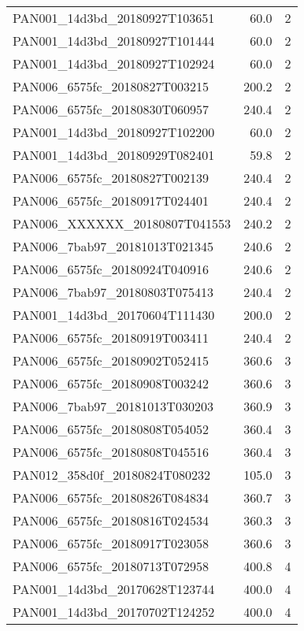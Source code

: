 \begin{tabular}{lrr}
PAN001\_14d3bd\_20180927T103651 &       60.0 &        2 \\
PAN001\_14d3bd\_20180927T101444 &       60.0 &        2 \\
PAN001\_14d3bd\_20180927T102924 &       60.0 &        2 \\
PAN006\_6575fc\_20180827T003215 &      200.2 &        2 \\
PAN006\_6575fc\_20180830T060957 &      240.4 &        2 \\
PAN001\_14d3bd\_20180927T102200 &       60.0 &        2 \\
PAN001\_14d3bd\_20180929T082401 &       59.8 &        2 \\
PAN006\_6575fc\_20180827T002139 &      240.4 &        2 \\
PAN006\_6575fc\_20180917T024401 &      240.4 &        2 \\
PAN006\_XXXXXX\_20180807T041553 &      240.2 &        2 \\
PAN006\_7bab97\_20181013T021345 &      240.6 &        2 \\
PAN006\_6575fc\_20180924T040916 &      240.6 &        2 \\
PAN006\_7bab97\_20180803T075413 &      240.4 &        2 \\
PAN001\_14d3bd\_20170604T111430 &      200.0 &        2 \\
PAN006\_6575fc\_20180919T003411 &      240.4 &        2 \\
PAN006\_6575fc\_20180902T052415 &      360.6 &        3 \\
PAN006\_6575fc\_20180908T003242 &      360.6 &        3 \\
PAN006\_7bab97\_20181013T030203 &      360.9 &        3 \\
PAN006\_6575fc\_20180808T054052 &      360.4 &        3 \\
PAN006\_6575fc\_20180808T045516 &      360.4 &        3 \\
PAN012\_358d0f\_20180824T080232 &      105.0 &        3 \\
PAN006\_6575fc\_20180826T084834 &      360.7 &        3 \\
PAN006\_6575fc\_20180816T024534 &      360.3 &        3 \\
PAN006\_6575fc\_20180917T023058 &      360.6 &        3 \\
PAN006\_6575fc\_20180713T072958 &      400.8 &        4 \\
PAN001\_14d3bd\_20170628T123744 &      400.0 &        4 \\
PAN001\_14d3bd\_20170702T124252 &      400.0 &        4 \\

\end{tabular}
